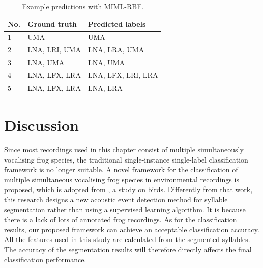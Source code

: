 \begin{table}[htb!]
\centering
\caption{Example predictions with MIML-RBF.}
\label{tab:prediction}
\begin{tabular}{lll}
\hline\hline
{\bf No.} &{\bf Ground truth} & {\bf Predicted labels} \\ \hline
1&UMA                & UMA                    \\ 
2&LNA, LRI, UMA      & LNA, LRA, UMA          \\ 
3&LNA, UMA           & LNA, UMA               \\ 
4&LNA, LFX, LRA      & LNA, LFX, LRI, LRA     \\ 
5&LNA, LFX, LRA      & LNA, LRA               \\ \hline\hline
\end{tabular}
\end{table}



\section{Discussion}
Since most recordings used in this chapter consist of multiple simultaneously vocalising frog species, the traditional single-instance single-label classification framework is no longer suitable. A novel framework for the classification of multiple simultaneous vocalising frog species in environmental recordings is proposed, which is adopted from \citep{briggs2012acoustic}, a study on birds. Differently from that work, this research designs a new acoustic event detection method for syllable segmentation rather than using a supervised learning algorithm. It is because there is a lack of lots of annotated frog recordings. As for the classification results, our proposed framework can achieve an acceptable classification accuracy. All the features used in this study are calculated from the segmented syllables. The accuracy of the segmentation results will therefore directly affects the final classification performance.


